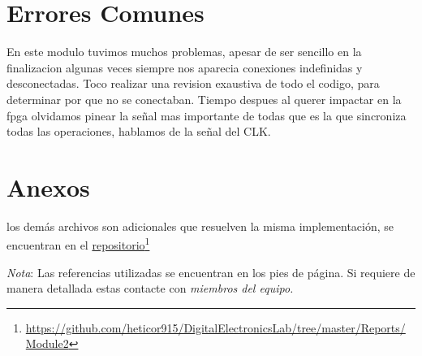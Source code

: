 \documentclass[paper=a4, fontsize=12pt]{article}        %
\newcommand\fnurl[2]{%
\href{#2}{#1}\footnote{\url{#2}}%
}
\numberwithin{equation}{section}                        %
\numberwithin{table}{section}                           %
\numberwithin{equation}{section}						%
\numberwithin{table}{section} 							%
\begin{document}
\section{Errores Comunes}
En este modulo tuvimos muchos problemas, apesar de ser sencillo en la finalizacion algunas veces siempre nos aparecia conexiones indefinidas y desconectadas. Toco realizar una revision exaustiva de todo el codigo, para determinar por que no se conectaban.
Tiempo despues al querer impactar en la fpga olvidamos pinear la señal mas importante de todas que es la que sincroniza todas las operaciones, hablamos de la señal del CLK. 
\section{Anexos}
los demás archivos son adicionales que resuelven la misma implementación, se encuentran en el \fnurl{repositorio}{https://github.com/heticor915/DigitalElectronicsLab/tree/master/Reports/Module2}
\textit{Nota}: Las referencias utilizadas se encuentran en los pies de página. Si requiere de manera detallada estas contacte con \emph{miembros del equipo.}
\end{document}
